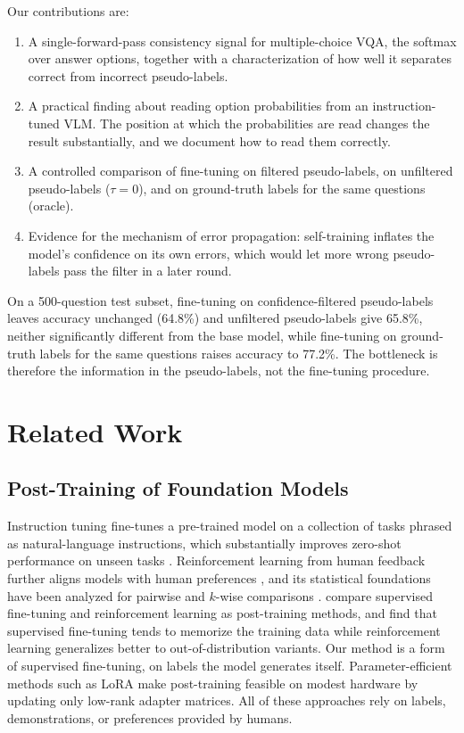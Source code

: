 \documentclass{article}
\begin{document}
Our contributions are:
\begin{enumerate}[itemsep=1pt,topsep=2pt]
  \item A single-forward-pass consistency signal for multiple-choice VQA, the softmax over answer options, together with a characterization of how well it separates correct from incorrect pseudo-labels.
  \item A practical finding about reading option probabilities from an instruction-tuned VLM. The position at which the probabilities are read changes the result substantially, and we document how to read them correctly.
  \item A controlled comparison of fine-tuning on filtered pseudo-labels, on unfiltered pseudo-labels ($\tau = 0$), and on ground-truth labels for the same questions (oracle).
  \item Evidence for the mechanism of error propagation: self-training inflates the model's confidence on its own errors, which would let more wrong pseudo-labels pass the filter in a later round.
\end{enumerate}
On a 500-question test subset, fine-tuning on confidence-filtered pseudo-labels leaves accuracy unchanged (64.8\%) and unfiltered pseudo-labels give 65.8\%, neither significantly different from the base model, while fine-tuning on ground-truth labels for the same questions raises accuracy to 77.2\%. The bottleneck is therefore the information in the pseudo-labels, not the fine-tuning procedure.

\section{Related Work}

\subsection{Post-Training of Foundation Models}
Instruction tuning fine-tunes a pre-trained model on a collection of tasks phrased as natural-language instructions, which substantially improves zero-shot performance on unseen tasks \citep{wei2022flan}. Reinforcement learning from human feedback further aligns models with human preferences \citep{ouyang2022instructgpt}, and its statistical foundations have been analyzed for pairwise and $k$-wise comparisons \citep{zhu2023principled}. \citet{chu2025sft} compare supervised fine-tuning and reinforcement learning as post-training methods, and find that supervised fine-tuning tends to memorize the training data while reinforcement learning generalizes better to out-of-distribution variants. Our method is a form of supervised fine-tuning, on labels the model generates itself. Parameter-efficient methods such as LoRA \citep{hu2022lora} make post-training feasible on modest hardware by updating only low-rank adapter matrices. All of these approaches rely on labels, demonstrations, or preferences provided by humans.
\end{document}
